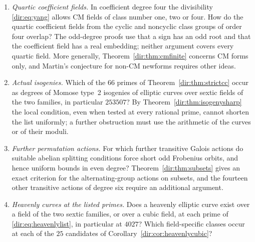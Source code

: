 \begin{enumerate}
\item \emph{Quartic coefficient fields.} In coefficient degree four the divisibility
 \eqref{dir:eq:yang} allows CM fields of class number one, two or four. How do the
 quartic coefficient fields from the cyclic and noncyclic class groups of order four
 overlap? The odd-degree proofs use that a sign has an odd root and that the
 coefficient field has a real embedding; neither argument covers every quartic field.
 More generally, Theorem~\ref{dir:thm:cmfinite} concerns CM forms only, and Martin's
 conjecture for non-CM newforms requires other ideas.
\item \emph{Actual isogenies.} Which of the $66$ primes of Theorem~\ref{dir:thm:strictcc}
 occur as degrees of Momose type~2 isogenies of elliptic curves over sextic fields of
 the two families, in particular $253507$? By Theorem~\ref{dir:thm:isogenysharp} the local
 condition, even when tested at every rational prime, cannot shorten the list
 uniformly; a further obstruction must use the arithmetic of the curves or of their
 moduli.
\item \emph{Further permutation actions.} For which further transitive Galois actions
 do suitable abelian splitting conditions force short odd Frobenius orbits, and hence
 uniform bounds in even degree? Theorem~\ref{dir:thm:subsets} gives an exact criterion for
 the alternating-group actions on subsets, and the fourteen other transitive actions
 of degree six require an additional argument.
\item \emph{Heavenly curves at the listed primes.} Does a heavenly elliptic curve
 exist over a field of the two sextic families, or over a cubic field, at each prime
 of \eqref{dir:eq:heavenlylist}, in particular at $4027$? Which field-specific classes
 occur at each of the $25$ candidates of Corollary~\ref{dir:cor:heavenlycubic}?
\end{enumerate}
